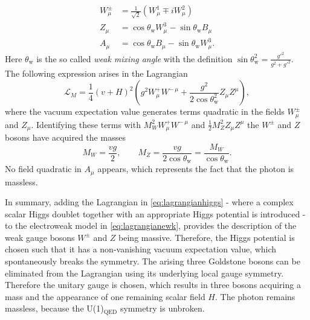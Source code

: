 \begin{align}
  W_\mu^\pm &= \frac{1}{\sqrt{2}} \left( W_\mu^1 \mp iW_\mu^2 \right) \\
  Z_\mu &= \cos\theta_\text{w} W_\mu^3 - \sin\theta_\text{w} B_\mu \\
  A_\mu &= \cos\theta_\text{w} B_\mu - \sin\theta_\text{w} W_\mu^3.
\end{align}
Here $\theta_\text{w}$ is the so called \emph{weak mixing angle} with the definition $\sin\theta_\text{w}^2 = \frac{g'^2}{g^2+g'^2}$.
The following expression arises in the Lagrangian %
\begin{equation}
  \mathcal{L}_M = \frac{1}{4} \left( v + H \right)^2  \left(g^2 W_\mu^+W^{-\,\mu} + \frac{g^2}{2\cos\theta_\text{w}^2} Z_\mu Z^\mu \right),
  \label{eq:lagrangianmasses}
\end{equation}
where the vacuum expectation value generates terms quadratic in the fields $W_\mu^\pm$ and $Z_\mu$. Identifying these terms with $M_W^2 W_\mu^+W^{-\,\mu}$ and $\frac{1}{2} M_Z^2 Z_\mu Z^\mu$ the $W^\pm$ and $Z$ bosons have acquired the masses
\begin{equation}
  M_W = \frac{v g}{2}, \qquad  
  M_Z = \frac{v g}{2\cos\theta_\text{w}} = \frac{M_W}{\cos\theta_\text{w}}.
\end{equation}
No field quadratic in $A_\mu$ appears, which represents the fact that the photon is massless.

In summary, adding the Lagrangian in \cref{eq:lagrangianhiggs} - where a complex scalar Higgs doublet together with an appropriate Higgs potential is introduced - to the electroweak model in \cref{eq:lagrangianewk}, provides the description of the weak gauge bosons $W^\pm$ and $Z$ being massive.
Therefore, the Higgs potential is chosen such that it has a non-vanishing vacuum expectation value, which spontaneously breaks the symmetry. The arising three Goldstone bosons can be eliminated from the Lagrangian using its underlying local gauge symmetry. Therefore the unitary gauge is chosen, which results in three bosons acquiring a mass and the appearance of one remaining scalar field $H$. The photon remains massless, because the U(1)$_{\text{QED}}$ symmetry is unbroken.


